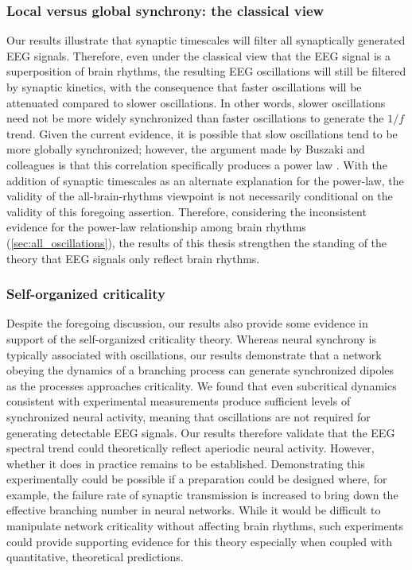 \subsubsection{Local versus global synchrony: the classical view}
Our results illustrate that synaptic timescales will filter all synaptically generated EEG signals. Therefore, even under the classical view that the EEG signal is a superposition of brain rhythms, the resulting EEG oscillations will still be filtered by synaptic kinetics, with the consequence that faster oscillations will be attenuated compared to slower oscillations. In other words, slower oscillations need not be more widely synchronized than faster oscillations to generate the $1/f$ trend. Given the current evidence, it is possible that slow oscillations tend to be more globally synchronized; however, the argument made by Buszaki and colleagues is that this correlation specifically produces a power law \cite{Buzsaki2006,Penttonen2003}. With the addition of synaptic timescales as an alternate explanation for the power-law, the validity of the all-brain-rhythms viewpoint is not necessarily conditional on the validity of this foregoing assertion. Therefore, considering the inconsistent evidence for the power-law relationship among brain rhythms (\autoref{sec:all_oscillations}), the results of this thesis strengthen the standing of the theory that EEG signals only reflect brain rhythms. 

\subsubsection{Self-organized criticality}
Despite the foregoing discussion, our results also provide some evidence in support of the self-organized criticality theory. Whereas neural synchrony is typically associated with oscillations, our results demonstrate that a network obeying the dynamics of a branching process can generate synchronized dipoles as the processes approaches criticality. We found that even subcritical dynamics consistent with experimental measurements \cite{Wilting2018,Wilting2019,Suryadi2022} produce sufficient levels of synchronized neural activity, meaning that oscillations are not required for generating detectable EEG signals. Our results therefore validate that the EEG spectral trend could theoretically reflect aperiodic neural activity. However, whether it does in practice remains to be established. Demonstrating this experimentally could be possible if a preparation could be designed where, for example, the failure rate of synaptic transmission is increased to bring down the effective branching number in neural networks. While it would be difficult to manipulate network criticality without affecting brain rhythms, such experiments could provide supporting evidence for this theory especially when coupled with quantitative, theoretical predictions.

